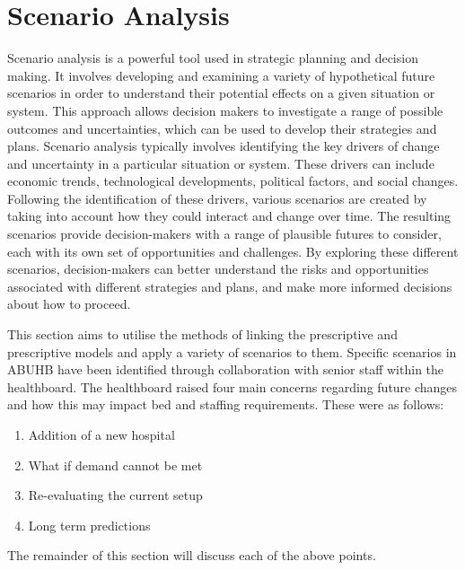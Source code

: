 \documentclass[../thesis.tex]{subfiles}
\begin{document}
\section{Scenario Analysis}\label{sec:scenarioanalysis}
Scenario analysis is a powerful tool used in strategic planning and decision making. It involves developing and examining a variety of hypothetical future scenarios in order to understand their potential effects on a given situation or system. This approach allows decision makers to investigate a range of possible outcomes and uncertainties, which can be used to develop their strategies and plans. Scenario analysis typically involves identifying the key drivers of change and uncertainty in a particular situation or system. These drivers can include economic trends, technological developments, political factors, and social changes. Following the identification of these drivers, various scenarios are created by taking into account how they could interact and change over time. The resulting scenarios provide decision-makers with a range of plausible futures to consider, each with its own set of opportunities and challenges. By exploring these different scenarios, decision-makers can better understand the risks and opportunities associated with different strategies and plans, and make more informed decisions about how to proceed.

This section aims to utilise the methods of linking the prescriptive and prescriptive models and apply a variety of scenarios to them. Specific scenarios in ABUHB have been identified through collaboration with senior staff within the healthboard. The healthboard raised four main concerns regarding future changes and how this may impact bed and staffing requirements. These were as follows:


\begin{enumerate}
    \item Addition of a new hospital
    \item What if demand cannot be met 
    \item Re-evaluating the current setup
    \item Long term predictions
\end{enumerate}

The remainder of this section will discuss each of the above points.
\end{document}
